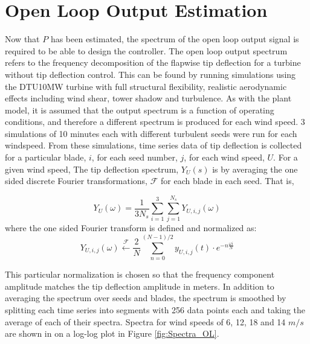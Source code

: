 \section{Open Loop Output Estimation}
Now that $P$ has been estimated, the spectrum of the open loop output signal is required to be able to design the controller. The open loop output spectrum refers to the frequency decomposition of the flapwise tip deflection for a turbine without tip deflection control. This can be found by running simulations using the DTU10MW turbine with full structural flexibility, realistic aerodynamic effects including wind shear, tower shadow and turbulence. As with the plant model, it is assumed that the output spectrum is a function of operating conditions, and therefore a different spectrum is produced for each wind speed. 3 simulations of 10 minutes each with different turbulent seeds were run for each windspeed. From these simulations, time series data of tip deflection is collected for a particular blade, $i$, for each seed number, $j$, for each wind speed, $U$. For a given wind speed, The tip deflection spectrum, $Y_U(s)$ is by averaging the one sided discrete Fourier transformations, $\mathcal{F}$ for each blade in each seed. That is,

$$Y_U(\omega) = \frac{1}{3N_s}\sum^{3}_{i=1}\sum^{N_s}_{j=1}Y_{U,i,j}(\omega)$$
where the one sided Fourier transform is defined and normalized as:
$$Y_{U,i,j}(\omega)\xleftarrow{\mathcal{F}} \frac{2}{N}\sum^{(N-1)/2}_{n=0}y_{U,i,j}(t) \cdot e^{-n\frac{\omega i}{N}}$$

This particular normalization is chosen so that the frequency component amplitude matches the tip deflection amplitude in meters. In addition to averaging the spectrum over seeds and blades, the spectrum is smoothed by splitting each time series into segments with 256 data points each and taking the average of each of their spectra. Spectra for wind speeds of 6, 12, 18 and 14 $m/s$ are shown in on a log-log plot in Figure \ref{fig:Spectra_OL}. 


